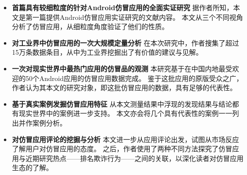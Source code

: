 \begin{itemize}
	\setlength{\itemsep}{1pt}
	\setlength{\parskip}{0pt}
	\setlength{\parsep}{0pt}

	\item{\bf 首篇具有较细粒度的针对Android仿冒应用的全面实证研究}
	据作者所知，本文是第一篇提供Android仿冒应用实证研究的文献内容。
	本文从三个不同视角分析了仿冒应用，从细粒度角度验证了他们的性质。

	\item{\bf 对工业界中仿冒应用的一次大规模定量分析}
	在本次研究中，作者搜集了超过15万条数据条目，从中为工业界挖掘出了有价值的建议与见解。

	\item {\bf 一次对现实世界中最热门应用的仿冒品的观测}
	本研究基于在中国内地最受欢迎的50个Android应用的仿冒应用数据完成。
	鉴于这批应用的原版受众之广，作者认为其本文的研究对象，即这批仿冒应用的数据，具有足够的代表性。

	\item {\bf 基于真实案例发掘仿冒应用特征}
	从本文测量结果中浮现的发现结果与结论都有现实世界中的案例进一步支持。
	本文亦会将几个具有代表性的案例一一列出并作案例分析。

	\item {\bf 对仿冒应用评论的挖掘与分析}
	本文进一步从应用评论出发，试图从市场反应了解用户对仿冒应用的态度。
	之后，作者使用了两种不同方法探究了仿冒应用与近期研究热点——排名欺诈行为——之间的关联，以深化读者对仿冒应用生态的了解。



\end{itemize}


